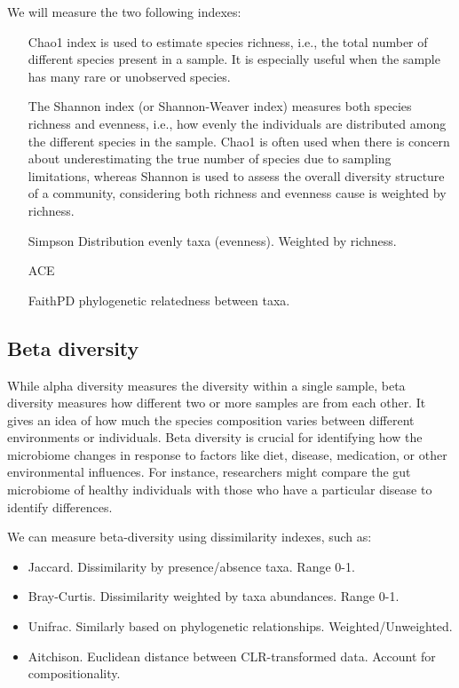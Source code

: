 We will measure the two following indexes:
\begin{itemize}
    \item[Chao1 index] is used to estimate species richness, i.e., the total number of different species present in a 
    sample. It is especially useful when the sample has many rare or unobserved species.
    \item[The Shannon index (or Shannon-Weaver index)] measures both species richness and evenness, i.e., how evenly the 
    individuals are distributed among the different species in the sample. Chao1 is often used when there is concern about 
    underestimating the true number of species due to sampling limitations, whereas Shannon is used to assess the overall 
    diversity structure of a community, considering both richness and evenness cause is weighted by richness.
    \item[Simpson] Distribution evenly taxa (evenness). Weighted by richness.
    \item[ACE]
    \item[FaithPD] phylogenetic relatedness between taxa.
\end{itemize}

\subsection{Beta diversity}
While alpha diversity measures the diversity within a single sample, beta diversity measures how different two or more 
samples are from each other. It gives an idea of how much the species composition varies between different environments 
or individuals. Beta diversity is crucial for identifying how the microbiome changes in response to factors like diet, 
disease, medication, or other environmental influences. For instance, researchers might compare the gut microbiome of 
healthy individuals with those who have a particular disease to identify differences.

We can measure beta-diversity using dissimilarity indexes, such as:
\begin{itemize}
    \item Jaccard. Dissimilarity by presence/absence taxa. Range 0-1.
    \item Bray-Curtis. Dissimilarity weighted by taxa abundances. Range 0-1.
    \item Unifrac. Similarly based on phylogenetic relationships. Weighted/Unweighted.
    \item Aitchison. Euclidean distance between CLR-transformed data. Account for compositionality.
\end{itemize}

